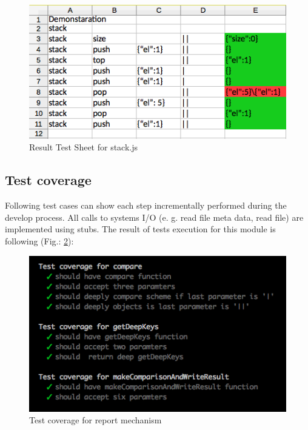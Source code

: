 \begin{figure}[H]
	\centering
	\includegraphics[width=\linewidth]{grafiken/testSheetResult.png}
	\caption{Result Test Sheet for stack.js}
	\label{fig:resultTestSheet}
\end{figure}


\subsection{Test coverage}
Following test cases can show each step incrementally performed during the develop process. All calls to systems I/O (e. g. read file meta data, read file) are implemented using stubs.
The result of tests execution  for this module is following (Fig.: \ref{fig:testReport}): 
\begin{figure}[H]
	\centering
	\includegraphics[width=\linewidth]{grafiken/testReport.png}
	\caption{Test coverage for report mechanism}
	\label{fig:testReport}
\end{figure}

